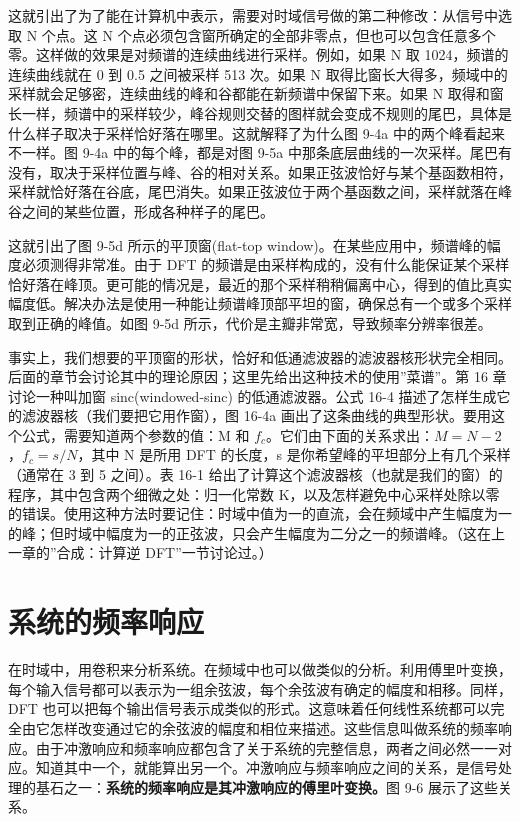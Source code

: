这就引出了为了能在计算机中表示，需要对时域信号做的第二种修改：从信号中选取
N 个点。这 N
个点必须包含窗所确定的全部非零点，但也可以包含任意多个零。这样做的效果是对频谱的连续曲线进行采样。例如，如果
N 取 1024，频谱的连续曲线就在 0 到 0.5 之间被采样 513 次。如果 N
取得比窗长大得多，频域中的采样就会足够密，连续曲线的峰和谷都能在新频谱中保留下来。如果
N
取得和窗长一样，频谱中的采样较少，峰谷规则交替的图样就会变成不规则的尾巴，具体是什么样子取决于采样恰好落在哪里。这就解释了为什么图
9-4a 中的两个峰看起来不一样。图 9-4a 中的每个峰，都是对图 9-5a
中那条底层曲线的一次采样。尾巴有没有，取决于采样位置与峰、谷的相对关系。如果正弦波恰好与某个基函数相符，采样就恰好落在谷底，尾巴消失。如果正弦波位于两个基函数之间，采样就落在峰谷之间的某些位置，形成各种样子的尾巴。

这就引出了图 9-5d 所示的平顶窗(flat-top
window)。在某些应用中，频谱峰的幅度必须测得非常准。由于 DFT
的频谱是由采样构成的，没有什么能保证某个采样恰好落在峰顶。更可能的情况是，最近的那个采样稍稍偏离中心，得到的值比真实幅度低。解决办法是使用一种能让频谱峰顶部平坦的窗，确保总有一个或多个采样取到正确的峰值。如图
9-5d 所示，代价是主瓣非常宽，导致频率分辨率很差。

事实上，我们想要的平顶窗的形状，恰好和低通滤波器的滤波器核形状完全相同。后面的章节会讨论其中的理论原因；这里先给出这种技术的使用''菜谱''。第
16 章讨论一种叫加窗 sinc(windowed-sinc) 的低通滤波器。公式 16-4
描述了怎样生成它的滤波器核（我们要把它用作窗），图 16-4a
画出了这条曲线的典型形状。要用这个公式，需要知道两个参数的值：M 和
\(f_c\)。它们由下面的关系求出：\(M = N - 2\)，\(f_c = s/N\)，其中 N
是所用 DFT 的长度，s 是你希望峰的平坦部分上有几个采样（通常在 3 到 5
之间）。表 16-1
给出了计算这个滤波器核（也就是我们的窗）的程序，其中包含两个细微之处：归一化常数
K，以及怎样避免中心采样处除以零的错误。使用这种方法时要记住：时域中值为一的直流，会在频域中产生幅度为一的峰；但时域中幅度为一的正弦波，只会产生幅度为二分之一的频谱峰。（这在上一章的''合成：计算逆
DFT''一节讨论过。）

\section{系统的频率响应}

在时域中，用卷积来分析系统。在频域中也可以做类似的分析。利用傅里叶变换，每个输入信号都可以表示为一组余弦波，每个余弦波有确定的幅度和相移。同样，DFT
也可以把每个输出信号表示成类似的形式。这意味着任何线性系统都可以完全由它怎样改变通过它的余弦波的幅度和相位来描述。这些信息叫做系统的频率响应。由于冲激响应和频率响应都包含了关于系统的完整信息，两者之间必然一一对应。知道其中一个，就能算出另一个。冲激响应与频率响应之间的关系，是信号处理的基石之一：\textbf{系统的频率响应是其冲激响应的傅里叶变换。}图
9-6 展示了这些关系。

